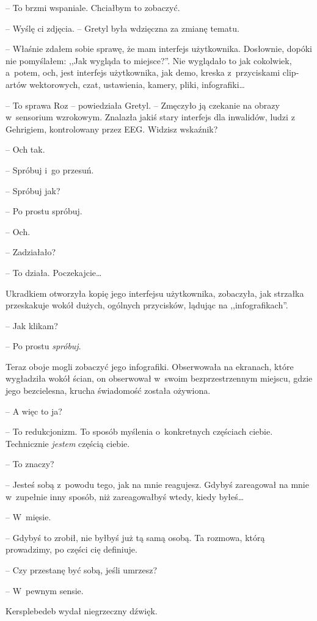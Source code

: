 \documentclass[oneside,polish,11pt,sfheadings]{mwbk}
\begin{document}
-- To brzmi wspaniale. Chciałbym to zobaczyć.

-- Wyślę ci zdjęcia. -- Gretyl była wdzięczna za zmianę tematu.

-- Właśnie zdałem sobie sprawę, że mam interfejs użytkownika. Dosłownie,
dopóki nie pomyślałem: ,,Jak wygląda to miejsce?''. Nie wyglądało to jak
cokolwiek, a~potem, och, jest interfejs użytkownika, jak demo, kreska z~przyciskami clip-artów wektorowych, czat, ustawienia, kamery, pliki,
infografiki\ldots 

-- To sprawa Roz -- powiedziała Gretyl. -- Zmęczyło ją czekanie na obrazy w~sensorium wzrokowym. Znalazła jakiś stary interfejs dla inwalidów, ludzi
z Gehrigiem, kontrolowany przez EEG. Widzisz wskaźnik?

-- Och tak.

-- Spróbuj i~go przesuń.

-- Spróbuj jak?

-- Po prostu spróbuj.

-- Och.

-- Zadziałało?

-- To działa. Poczekajcie\ldots 

Ukradkiem otworzyła kopię jego interfejsu użytkownika, zobaczyła, jak
strzałka przeskakuje wokół dużych, ogólnych przycisków, lądując na
,,infografikach''.

-- Jak klikam?

-- Po prostu \textit{spróbuj}.

Teraz oboje mogli zobaczyć jego infografiki. Obserwowała na ekranach,
które wygładziła wokół ścian, on obserwował w~swoim bezprzestrzennym
miejscu, gdzie jego bezcielesna, krucha świadomość została ożywiona.

-- A więc to ja?

-- To redukcjonizm. To sposób myślenia o~konkretnych częściach ciebie.
Technicznie \textit{jestem }częścią ciebie.

-- To znaczy?

-- Jesteś sobą z~powodu tego, jak na mnie reagujesz. Gdybyś zareagował na
mnie w~zupełnie inny sposób, niż zareagowałbyś wtedy, kiedy byłeś\ldots 

-- W~mięsie.

-- Gdybyś to zrobił, nie byłbyś już tą samą osobą. Ta rozmowa, którą
prowadzimy, po części cię definiuje.

-- Czy przestanę być sobą, jeśli umrzesz?

-- W~pewnym sensie.

Kersplebedeb wydał niegrzeczny dźwięk.
\end{document}
